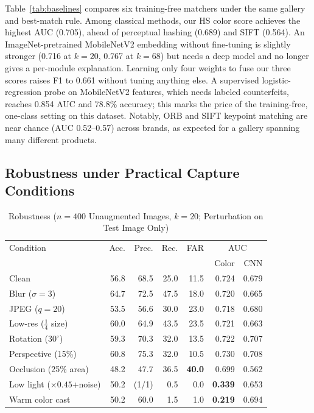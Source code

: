 \documentclass[conference]{IEEEtran}
\begin{document}
Table~\ref{tab:baselines} compares six training-free matchers under the
same gallery and best-match rule. Among classical methods, our HS color
score achieves the highest AUC (0.705), ahead of perceptual hashing
(0.689) and SIFT (0.564). An ImageNet-pretrained MobileNetV2 embedding
without fine-tuning is slightly stronger (0.716 at $k{=}20$, 0.767 at
$k{=}68$) but needs a deep model and no longer gives a per-module
explanation. Learning only four weights to fuse our three scores raises
F1 to 0.661 without tuning anything else. A supervised logistic-regression
probe on MobileNetV2 features, which needs labeled counterfeits, reaches
0.854 AUC and 78.8\% accuracy; this marks the price of the training-free,
one-class setting on this dataset. Notably, ORB and SIFT keypoint
matching are near chance (AUC 0.52--0.57) across brands, as expected for
a gallery spanning many different products.

\subsection{Robustness under Practical Capture Conditions}
\label{sec:robust}

\begin{table}[t]
\caption{Robustness ($n{=}400$ Unaugmented Images, $k{=}20$; Perturbation on Test Image Only)}
\label{tab:robust}
\centering
\setlength{\tabcolsep}{3pt}
\begin{tabular}{lrrrrrr}
\toprule
Condition & Acc. & Prec. & Rec. & FAR & \multicolumn{2}{c}{AUC} \\
 & & & & & Color & CNN \\
\midrule
Clean                          & 56.8 & 68.5 & 25.0 & 11.5 & 0.724 & 0.679 \\
Blur ($\sigma{=}3$)            & 64.7 & 72.5 & 47.5 & 18.0 & 0.720 & 0.665 \\
JPEG ($q{=}20$)                & 53.5 & 56.6 & 30.0 & 23.0 & 0.718 & 0.680 \\
Low-res ($\tfrac14$ size)      & 60.0 & 64.9 & 43.5 & 23.5 & 0.721 & 0.663 \\
Rotation ($30^\circ$)          & 59.3 & 70.3 & 32.0 & 13.5 & 0.722 & 0.707 \\
Perspective (15\%)             & 60.8 & 75.3 & 32.0 & 10.5 & 0.730 & 0.708 \\
Occlusion (25\% area)          & 48.2 & 47.7 & 36.5 & \textbf{40.0} & 0.699 & 0.562 \\
Low light ($\times0.45$+noise) & 50.2 & (1/1) & 0.5 & 0.0 & \textbf{0.339} & 0.653 \\
Warm color cast               & 50.2 & 60.0 & 1.5 & 1.0 & \textbf{0.219} & 0.694 \\
\bottomrule
\end{tabular}
\end{table}
\end{document}

